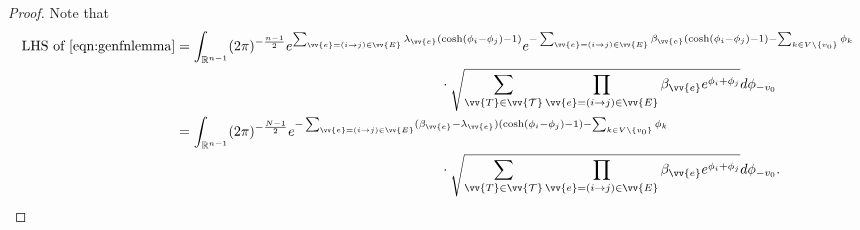 \documentclass[a4paper, 11pt]{article}
\begin{document}
\begin{proof}
Note that
\begin{equation*}
\begin{aligned}
\text{LHS of \cref{eqn:genfnlemma}}
&= \int_{\mathbb{R}^{n-1}} (2\pi)^{-\frac{n-1}{2}} e^{\sum_{\vv{e}=(i\to j)\in \vv{E}} \lambda_{\vv{e}} (\cosh(\phi_i - \phi_j) - 1)} e^{-\sum_{\vv{e}=(i\to j)\in \vv{E}} \beta_{\vv{e}} (\cosh(\phi_i - \phi_j) - 1) - \sum_{k \in V \setminus \{v_0\}} \phi_k} \\
& \hspace{19em} \cdot \sqrt{\sum_{\vv{T} \in \vv{\mathcal{T}}} \prod_{\vv{e}=(i\to j)\in \vv{E}} \beta_{\vv{e}} e^{\phi_i + \phi_j}} d\phi_{-v_0} \\
&= \int_{\mathbb{R}^{n-1}} (2\pi)^{-\frac{N-1}{2}} e^{-\sum_{\vv{e}=(i\to j)\in \vv{E}} (\beta_{\vv{e}} - \lambda_{\vv{e}}) (\cosh(\phi_i - \phi_j) - 1) - \sum_{k \in V \setminus \{v_0\}} \phi_k} \\
& \hspace{19em} \cdot \sqrt{\sum_{\vv{T} \in \vv{\mathcal{T}}} \prod_{\vv{e}=(i\to j)\in \vv{E}} \beta_{\vv{e}} e^{\phi_i + \phi_j}} d\phi_{-v_0}.
\end{aligned}
\end{equation*}


\end{proof}
\end{document}
